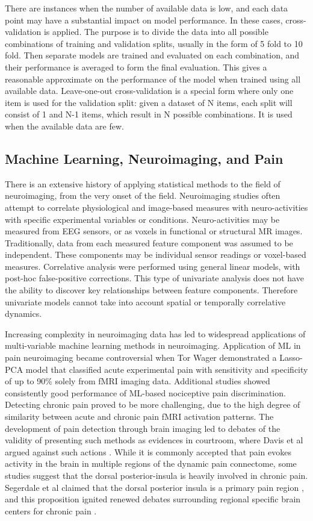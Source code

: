 There are instances when the number of available data is low, and each data point may have a substantial impact on model performance. In these cases, cross-validation is applied. The purpose is to divide the data into all possible combinations of training and validation splits, usually in the form of 5 fold to 10 fold. Then separate models are trained and evaluated on each combination, and their performance is averaged to form the final evaluation. This gives a reasonable approximate on the performance of the model when trained using all available data. Leave-one-out cross-validation is a special form where only one item is used for the validation split: given a dataset of N items, each split will consist of 1 and N-1 items, which result in N possible combinations. It is used when the available data are few. 
 
\subsection{Machine Learning, Neuroimaging, and Pain}

There is an extensive history of applying statistical methods to the field of neuroimaging, from the very onset of the field. Neuroimaging studies often attempt to correlate physiological and image-based measures with neuro-activities with specific experimental variables or conditions. Neuro-activities may be measured from EEG sensors, or as voxels in functional or structural MR images. Traditionally, data from each measured feature component was assumed to be independent. These components may be individual sensor readings or voxel-based measures. Correlative analysis were performed using general linear models, with post-hoc false-positive corrections. This type of univariate analysis does not have the ability to discover key relationships between feature components. Therefore univariate models cannot take into account spatial or temporally correlative dynamics. 

Increasing complexity in neuroimaging data has led to widespread applications of multi-variable machine learning methods in neuroimaging. Application of ML in pain neuroimaging became controversial when Tor Wager \cite{Wager2013} demonstrated a Lasso-PCA model that classified acute experimental pain with sensitivity and specificity of up to 90\% solely from fMRI imaging data. Additional studies showed consistently good performance of ML-based nociceptive pain discrimination. Detecting chronic pain proved to be more challenging, due to the high degree of similarity between acute and chronic pain fMRI activation patterns. The development of pain detection through brain imaging led to debates of the validity of presenting such methods as evidences in courtroom, where Davis et al argued against such actions \cite{Davis2012a,Davis2017}. While it is commonly accepted that pain evokes activity in the brain in multiple regions of the dynamic pain connectome, some studies suggest that the dorsal posterior-insula is heavily involved in chronic pain. Segerdale et al claimed that the dorsal posterior insula is a primary pain region \cite{Segerdahl2015a}, and this proposition ignited renewed debates surrounding regional specific brain centers for chronic pain \cite{Davis2015}.

